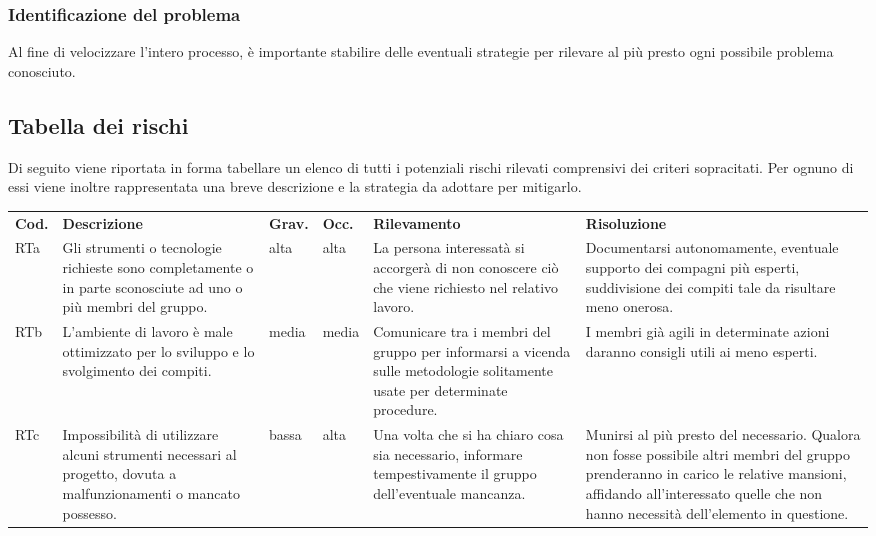     \subsubsection{Identificazione del problema}
        Al fine di velocizzare l'intero processo, è importante stabilire delle eventuali strategie per rilevare al più presto ogni possibile problema conosciuto.

\subsection{Tabella dei rischi}
        Di seguito viene riportata in forma tabellare un elenco di tutti i potenziali rischi rilevati comprensivi dei criteri sopracitati. Per ognuno di essi viene inoltre rappresentata una breve descrizione e la strategia da adottare per mitigarlo.
{
        \renewcommand{\arraystretch}{1.5}
        
        \begin{longtable}{|p{1cm}|p{3cm}|p{1cm}|p{1cm}|p{3cm}|p{3cm}|}
        \rowcolor{\primaryColor}
        \textcolor{\secondaryColor}{\textbf{Cod.}} & 
        \textcolor{\secondaryColor}{\textbf{Descrizione}} & 
        \textcolor{\secondaryColor}{\textbf{Grav.}} & 
        \textcolor{\secondaryColor}{\textbf{Occ.}} & 
        \textcolor{\secondaryColor}{\textbf{Rilevamento}} &
        \textcolor{\secondaryColor}{\textbf{Risoluzione}}\\

        RTa & 
        Gli strumenti o tecnologie richieste sono completamente o in parte sconosciute ad uno o più membri del gruppo. &
        alta & 
        alta &
        La persona interessatà si accorgerà di non conoscere ciò che viene richiesto nel relativo lavoro. &
        Documentarsi autonomamente, eventuale supporto dei compagni più esperti, suddivisione dei compiti tale da risultare meno onerosa.\\

        RTb &
        L'ambiente di lavoro è male ottimizzato per lo sviluppo e lo svolgimento dei compiti. &
        media &
        media &
        Comunicare tra i membri del gruppo per informarsi a vicenda sulle metodologie solitamente usate per determinate procedure. &
        I membri già agili in determinate azioni daranno consigli utili ai meno esperti. \\

        RTc &
        Impossibilità di utilizzare alcuni strumenti necessari al progetto, dovuta a malfunzionamenti o mancato possesso. &
        bassa &
        alta &
        Una volta che si ha chiaro cosa sia necessario, informare tempestivamente il gruppo dell'eventuale mancanza. &
        Munirsi al più presto del necessario. Qualora non fosse possibile altri membri del gruppo prenderanno in carico le relative mansioni, affidando all'interessato quelle che non hanno necessità dell'elemento in questione. \\


\end{longtable}}
